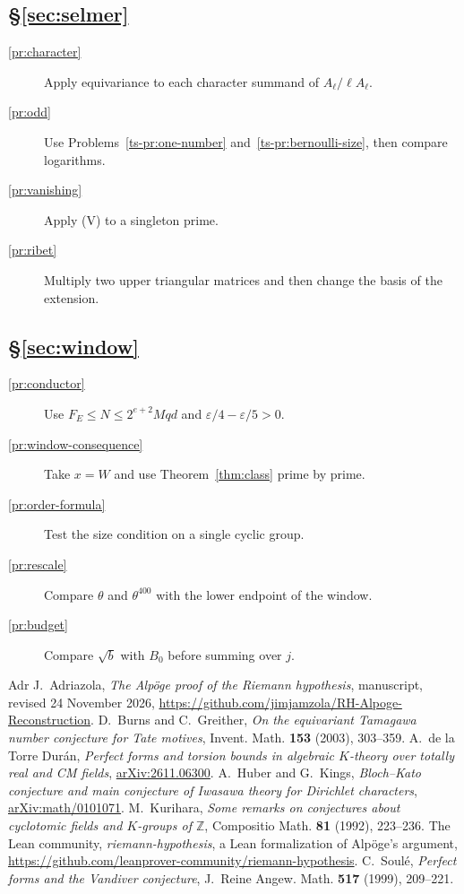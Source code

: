 \documentclass[reqno]{amsart}
\theoremstyle{definition}
\theoremstyle{plain}
\newcommand{\Z}{\mathbb Z}
\begin{document}
\subsection*{\S\ref{sec:selmer}}
\begin{description}
\item[\ref{pr:character}] Apply equivariance to each character summand of \(A_\ell/\ell A_\ell\).
\item[\ref{pr:odd}] Use Problems~\ref{ts-pr:one-number} and~\ref{ts-pr:bernoulli-size}, then compare logarithms.
\item[\ref{pr:vanishing}] Apply (V) to a singleton prime.
\item[\ref{pr:ribet}] Multiply two upper triangular matrices and then change the basis of the extension.
\end{description}
\subsection*{\S\ref{sec:window}}
\begin{description}
\item[\ref{pr:conductor}] Use \(F_E\le N\le 2^{e+2}Mqd\) and \(\varepsilon/4-\varepsilon/5>0\).
\item[\ref{pr:window-consequence}] Take \(x=W\) and use Theorem~\ref{thm:class} prime by prime.
\item[\ref{pr:order-formula}] Test the size condition on a single cyclic group.
\item[\ref{pr:rescale}] Compare \(\theta\) and \(\theta^{400}\) with the lower endpoint of the window.
\item[\ref{pr:budget}] Compare \(\sqrt b\) with \(B_0\) before summing over \(j\).
\end{description}

\begin{thebibliography}{Adr}
  J.~Adriazola, \emph{The Alp\"oge proof of the Riemann hypothesis}, manuscript, revised 24 November 2026, \url{https://github.com/jimjamzola/RH-Alpoge-Reconstruction}.
  D.~Burns and C.~Greither, \emph{On the equivariant Tamagawa number conjecture for Tate motives}, Invent.  Math. \textbf{153} (2003), 303--359.
  A.~de la Torre Dur\'an, \emph{Perfect forms and torsion bounds in algebraic \(K\)-theory over totally real and CM fields}, \href{https://arxiv.org/abs/2611.06300}{arXiv:2611.06300}.
  A.~Huber and G.~Kings, \emph{Bloch--Kato conjecture and main conjecture of Iwasawa theory for Dirichlet characters}, \href{https://arxiv.org/abs/math/0101071}{arXiv:math/0101071}.
  M.~Kurihara, \emph{Some remarks on conjectures about cyclotomic fields and \(K\)-groups of \(\Z\)}, Compositio Math. \textbf{81} (1992), 223--236.
 The Lean community, \emph{riemann-hypothesis}, a Lean formalization of Alp\"oge's argument, \url{https://github.com/leanprover-community/riemann-hypothesis}.
  C.~Soul\'e, \emph{Perfect forms and the Vandiver conjecture}, J.~Reine Angew.  Math. \textbf{517} (1999), 209--221.
\end{thebibliography}
\end{document}
